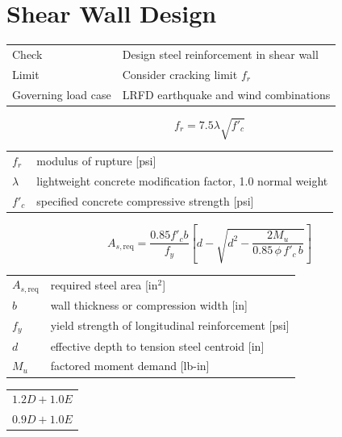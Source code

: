 \documentclass[10pt]{article}
\begin{document}
\section{Shear Wall Design}

{\ttfamily\footnotesize
\begin{tabular}{@{}p{2.2in}p{4.2in}@{}}
Check & Design steel reinforcement in shear wall \\
Limit & Consider cracking limit $f_r$ \\
Governing load case & LRFD earthquake and wind combinations \\
\end{tabular}
}

\begin{equation}
f_r = 7.5 \lambda \sqrt{f'_c}
\end{equation}

{\ttfamily\footnotesize
\begin{tabular}{@{}ll@{}}
$f_r$ & modulus of rupture [psi] \\
$\lambda$ & lightweight concrete modification factor, 1.0 normal weight \\
$f'_c$ & specified concrete compressive strength [psi] \\
\end{tabular}
}

\begin{equation}
A_{s,\text{req}} = \frac{0.85 f'_c b}{f_y}
\left[ d - \sqrt{d^2 - \frac{2 M_u}{0.85\, \phi\, f'_c\, b}} \right]
\end{equation}

{\ttfamily\footnotesize
\begin{tabular}{@{}ll@{}}
$A_{s,\text{req}}$ & required steel area [in$^2$] \\
$b$ & wall thickness or compression width [in] \\
$f_y$ & yield strength of longitudinal reinforcement [psi] \\
$d$ & effective depth to tension steel centroid [in] \\
$M_u$ & factored moment demand [lb-in] \\
\end{tabular}
}


{\ttfamily\footnotesize
\begin{tabular}{@{}p{6.9in}@{}}
$1.2D + 1.0E$ \\
$0.9D + 1.0E$ \\
\end{tabular}
}
\end{document}
